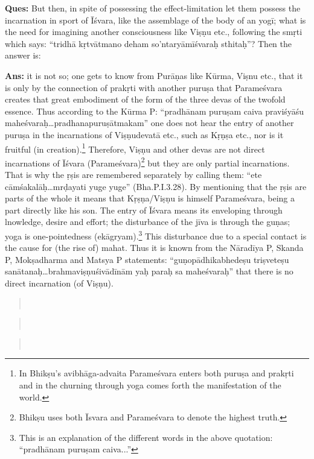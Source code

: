 \textbf{Ques:}  But then, in spite of possessing the effect-limitation let them possess the incarnation in sport of Īśvara, like the assemblage of the body of an yogī; what is the need for imagining another consciousness like Viṣṇu etc., following the smṛti which says: “tridhā kṛtvātmano deham so’ntaryāmīśvaraḥ sthitaḥ”? Then the answer is: 

\textbf{Ans:} it is not so; one gets to know from Purāṇas like Kūrma, Viṣnu etc., that it is only by the connection of prakṛti with another puruṣa that Parameśvara creates that great embodiment of the form of the three devas of the twofold essence. Thus according to the Kūrma P: “pradhānam puruṣam caiva praviśyāśu maheśvaraḥ…pradhanapuruṣātmakam” one does not hear the entry of another puruṣa in the incarnations of Viṣṇudevatā etc., such as Kṛṇṣa etc., nor is it fruitful (in creation).\footnote{In Bhikṣu’s avibhāga-advaita Parameśvara enters both puruṣa and prakṛti and in the churning through yoga comes forth the manifestation of the world.} Therefore, Viṣṇu and other devas are not direct incarnations of Īśvara (Parameśvara)\footnote{Bhikṣu uses both Īsvara and Parameśvara to denote the highest truth.} but they are only partial incarnations. That is why the ṛṣis are remembered separately by calling them: “ete cāmśakalāḥ…mrḍayati yuge yuge” (Bha.P.I.3.28). By mentioning that the ṛṣis are parts of the whole it means that Kṛṣṇa/Viṣṇu is himself Parameśvara, being a part directly like his son. The entry of Īśvara means its enveloping through lnowledge, desire and effort;   the disturbance of the jīva is through the guṇas; yoga is one-pointedness (ekāgryam).\footnote{This is an explanation of the different words in the above quotation: “pradhānam puruṣam caiva...”} This disturbance due to a special contact is the cause for (the rise of) mahat. Thus it is known from the Nāradīya P, Skanda P, Mokṣadharma and Matsya P statements: “guṇopādhikabhedeṣu triṣveteṣu sanātanaḥ…brahmaviṣṇuśivādīnām yaḥ paraḥ sa maheśvaraḥ” that there is no direct incarnation (of Viṣṇu).

\begin{verse}
\\
\end{verse}
\begin{verse}
\\
\end{verse}
\begin{verse}
\\
\end{verse}

